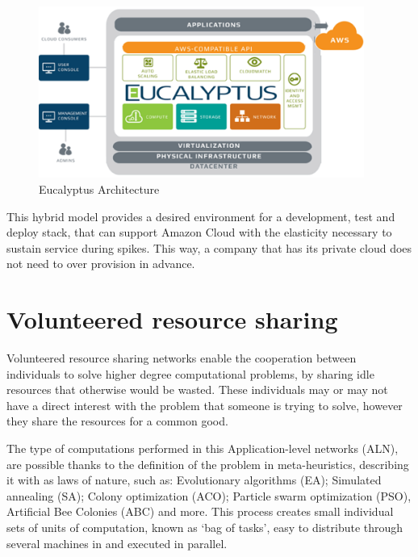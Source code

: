 \begin{figure}[hb]
  \centering
  \includegraphics[width=0.95\textwidth]{img/eucalyptus-architecture.png}
  \caption{Eucalyptus Architecture}
  \label{fig:eucalyptus}
\end{figure}

This hybrid model provides a desired environment for a development, test and deploy stack, that can support Amazon Cloud with the elasticity necessary to sustain service during spikes. This way, a company that has its private cloud does not need to over provision in advance.

% 
% 
\section{Volunteered resource sharing}

Volunteered resource sharing networks enable the cooperation between individuals to solve higher degree computational problems, by sharing idle resources that otherwise would be wasted. These individuals may or may not have a direct interest with the problem that someone is trying to solve, however they share the resources for a common good. 

The type of computations performed in this Application-level networks (ALN), are possible thanks to the definition of the problem in meta-heuristics, describing it with as laws of nature\cite{Duda2013}, such as: Evolutionary algorithms (EA); Simulated annealing (SA); Colony optimization (ACO); Particle swarm optimization (PSO), Artificial Bee Colonies (ABC) and more. This process creates small individual sets of units of computation, known as `bag of tasks', easy to distribute through several machines in and executed in parallel.
                  

